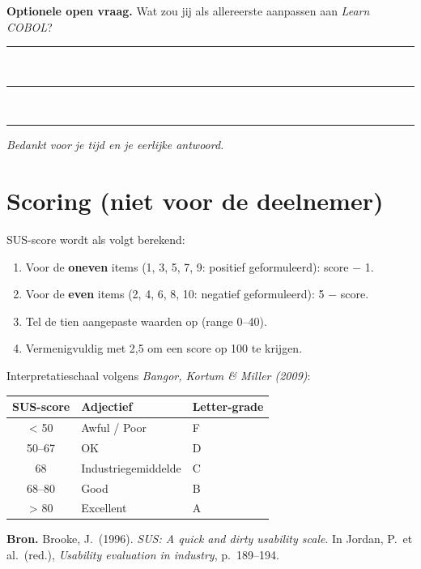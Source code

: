 \documentclass[11pt,a4paper]{article}
\begin{document}
\bigskip

\noindent\textbf{Optionele open vraag.} Wat zou jij als allereerste aanpassen aan \textit{Learn COBOL}?

\medskip
\noindent\rule{\textwidth}{0.4pt}\\[0.4cm]
\rule{\textwidth}{0.4pt}\\[0.4cm]
\rule{\textwidth}{0.4pt}

\bigskip

\noindent\textit{Bedankt voor je tijd en je eerlijke antwoord.}

\newpage
\section*{Scoring (niet voor de deelnemer)}

\noindent
SUS-score wordt als volgt berekend:

\begin{enumerate}
    \item Voor de \textbf{oneven} items (1, 3, 5, 7, 9: positief geformuleerd): score $-$ 1.
    \item Voor de \textbf{even} items (2, 4, 6, 8, 10: negatief geformuleerd): 5 $-$ score.
    \item Tel de tien aangepaste waarden op (range 0--40).
    \item Vermenigvuldig met 2,5 om een score op 100 te krijgen.
\end{enumerate}

\noindent
Interpretatieschaal volgens \textit{Bangor, Kortum \& Miller (2009)}:

\begin{center}
\begin{tabular}{|c|l|l|}
\hline
\textbf{SUS-score} & \textbf{Adjectief} & \textbf{Letter-grade} \\
\hline
< 50    & Awful / Poor   & F \\
\hline
50--67  & OK             & D \\
\hline
68      & Industriegemiddelde & C \\
\hline
68--80  & Good           & B \\
\hline
> 80    & Excellent      & A \\
\hline
\end{tabular}
\end{center}

\bigskip

\noindent\textbf{Bron.} Brooke, J.\ (1996). \textit{SUS: A quick and dirty usability scale}. In Jordan, P.\ et al.\ (red.), \textit{Usability evaluation in industry}, p.\ 189--194.
\end{document}
